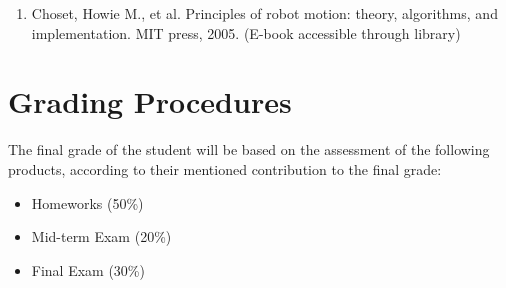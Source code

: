 \documentclass[a4paper]{article}
\begin{document}
\begin{itemize}
\begin{enumerate}[label=(\alph*)]
		\item Choset, Howie M., et al. Principles of robot motion: theory, algorithms, and implementation. MIT press, 2005. (E-book accessible through library)
	\end{enumerate}
\end{itemize}

\section{Grading Procedures}


The final grade of the student will be based on the assessment of the following products, according to their mentioned contribution to the final grade:
\begin{itemize}
	\item Homeworks (50\%)
	\item Mid-term Exam (20\%) 	
	\item Final Exam (30\%)
\end{itemize}
\end{document}
